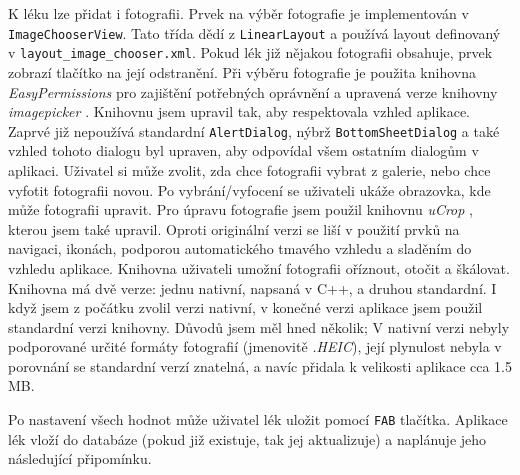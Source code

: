 \documentclass[../TakeYourPill.tex]{subfiles}
\begin{document}
K léku lze přidat i fotografii. Prvek na výběr fotografie je implementován v \texttt{ImageChooserView}. Tato třída dědí z \texttt{LinearLayout} a používá layout definovaný v \texttt{layout\_image\_chooser.xml}. Pokud lék již nějakou fotografii obsahuje, prvek zobrazí tlačítko na její odstranění. Při výběru fotografie je použita knihovna \textit{EasyPermissions} \cite{easy-permissions} pro zajištění potřebných oprávnění a upravená verze knihovny \textit{imagepicker} \cite{imagepicker}. Knihovnu jsem upravil tak, aby respektovala vzhled aplikace. Zaprvé již nepoužívá standardní \texttt{AlertDialog}, nýbrž \texttt{BottomSheetDialog} a také vzhled tohoto dialogu byl upraven, aby odpovídal všem ostatním dialogům v aplikaci. Uživatel si může zvolit, zda chce fotografii vybrat z galerie, nebo chce vyfotit fotografii novou. Po vybrání/vyfocení se uživateli ukáže obrazovka, kde může fotografii upravit. Pro úpravu fotografie jsem použil knihovnu \textit{uCrop} \cite{ucrop}, kterou jsem také upravil. Oproti originální verzi se liší v použití prvků na navigaci, ikonách, podporou automatického tmavého vzhledu a sladěním do vzhledu aplikace. Knihovna uživateli umožní fotografii oříznout, otočit a škálovat. Knihovna má dvě verze: jednu nativní, napsaná v C++, a druhou standardní. I když jsem z počátku zvolil verzi nativní, v konečné verzi aplikace jsem použil standardní verzi knihovny. Důvodů jsem měl hned několik; V nativní verzi nebyly podporované určité formáty fotografií (jmenovitě \textit{.HEIC}), její plynulost nebyla v porovnání se standardní verzí znatelná, a navíc přidala k velikosti aplikace cca 1.5 MB.

Po nastavení všech hodnot může uživatel lék uložit pomocí \texttt{FAB} tlačítka. Aplikace lék vloží do databáze (pokud již existuje, tak jej aktualizuje) a naplánuje jeho následující připomínku.

\end{document}

